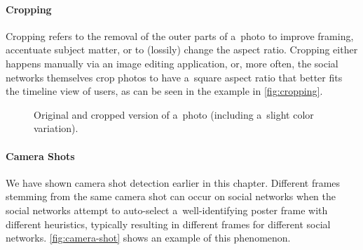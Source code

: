 \paragraph{Cropping}

Cropping refers to the removal of the outer parts of a~photo
to improve framing, accentuate subject matter,
or to (lossily) change the aspect ratio.
Cropping either happens manually via an image editing application,
or, more often, the social networks themselves crop photos
to have a~square aspect ratio
that better fits the timeline view of users,
as can be seen in the example in \autoref{fig:cropping}.

\begin{figure}[h!]
  \centering
  \caption{Original and cropped version of a~photo (including a~slight color variation).}
  \label{fig:cropping}  
\end{figure}

\paragraph{Camera Shots}

We have shown camera shot detection earlier in this chapter.
Different frames stemming from the same camera shot
can occur on social networks when the social networks attempt to auto-select
a~well-identifying poster frame with different heuristics,
typically resulting in different frames for different social networks.
\autoref{fig:camera-shot} shows an example of this phenomenon.


